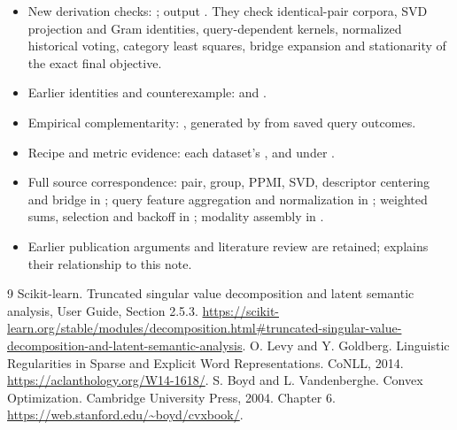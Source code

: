 \documentclass[11pt,a4paper]{article}
\begin{document}
\begin{itemize}
\item New derivation checks: ; output
.
They check identical-pair corpora, SVD projection and Gram identities,
query-dependent kernels, normalized historical voting, category least squares,
bridge expansion and stationarity of the exact final objective.
\item Earlier identities and counterexample:
 and
.
\item Empirical complementarity:
, generated by
 from saved query outcomes.
\item Recipe and metric evidence: each dataset's ,
 and  under
.
\item Full source correspondence: pair, group, PPMI, SVD, descriptor centering and
bridge in ; query feature aggregation and
normalization in ; weighted sums,
selection and backoff in ; modality assembly in
.
\item Earlier publication arguments and literature review are retained;
 explains their relationship to this note.
\end{itemize}

\begin{thebibliography}{9}
 Scikit-learn. Truncated singular value decomposition and latent
semantic analysis, User Guide, Section 2.5.3.
\url{https://scikit-learn.org/stable/modules/decomposition.html#truncated-singular-value-decomposition-and-latent-semantic-analysis}.
 O. Levy and Y. Goldberg. Linguistic Regularities in Sparse and
Explicit Word Representations. CoNLL, 2014.
\url{https://aclanthology.org/W14-1618/}.
 S. Boyd and L. Vandenberghe. Convex Optimization. Cambridge
University Press, 2004. Chapter 6.
\url{https://web.stanford.edu/~boyd/cvxbook/}.
\end{thebibliography}
\end{document}
